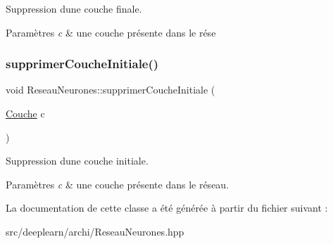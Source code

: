 Suppression d\textquotesingle{}une couche finale. 


\begin{DoxyParams}{Paramètres}
{\em c} & une couche présente dans le rése \\
\hline
\end{DoxyParams}
\mbox{\label{class_reseau_neurones_a1f8002e2367febe871dda7dc32c02784}} 
\subsubsection{\texorpdfstring{supprimer\+Couche\+Initiale()}{supprimerCoucheInitiale()}}
{\footnotesize\ttfamily void Reseau\+Neurones\+::supprimer\+Couche\+Initiale (\begin{DoxyParamCaption}\item[{\hyperlink{class_couche}{Couche}}]{c }\end{DoxyParamCaption})}



Suppression d\textquotesingle{}une couche initiale. 


\begin{DoxyParams}{Paramètres}
{\em c} & une couche présente dans le réseau. \\
\hline
\end{DoxyParams}


La documentation de cette classe a été générée à partir du fichier suivant \+:\begin{DoxyCompactItemize}
\item 
src/deeplearn/archi/Reseau\+Neurones.\+hpp\end{DoxyCompactItemize}
